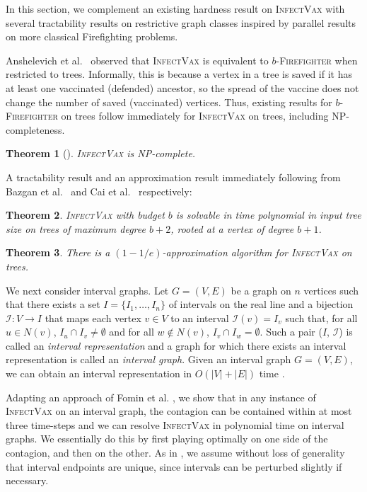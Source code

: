 \documentclass[unknownkeysallowed]{article}
\newtheorem{theorem}{Theorem}[section]
\theoremstyle{definition}\newtheorem{strategy}{Strategy}
\theoremstyle{definition}\newtheorem{notation}{Notation}[theorem]
\newcommand*{\Fire}{\textup{\textsc{Firefighter}}\xspace} %
\newcommand*{\bFire}{$b$-\Fire} %
\newcommand*{\IV}{\textup{\textsc{InfectVax}}\xspace}
\begin{document}
In this section, we complement an existing hardness result on \IV with several tractability results on restrictive graph classes inspired by parallel results on more classical Firefighting problems.  

Anshelevich et al.\ \cite{anshelevich_2012} observed that \IV is equivalent to \bFire when restricted to trees.
Informally, this is because a vertex in a tree is saved if it has at least one vaccinated (defended)  ancestor, so the spread of the vaccine does not change the number of saved (vaccinated) vertices.  Thus, existing results for \bFire on trees follow immediately for \IV on trees, including NP-completeness.
\begin{theorem}[\cite{anshelevich_2012}]
    \IV is NP-complete.
\end{theorem}

A tractability result and an approximation result immediately following from Bazgan et al.\  \cite{bazgan_2013} and Cai et al.\ \cite{cai_2008} respectively:

\begin{theorem}
    \IV with budget $b$ is solvable in time polynomial in input tree size on trees of maximum degree $b+2$, rooted at a vertex of degree $b+1$.
\end{theorem}

\begin{theorem}
    There is a $(1-1/e)$-approximation algorithm for \IV on trees.
\end{theorem}

We next consider interval graphs. Let $G=(V, E)$ be a graph on $n$ vertices such that there exists a set $I=\{I_1, \dots, I_n\}$ of intervals on the real line and a bijection $\mathcal{I}:V\rightarrow I$ that maps each vertex $v\in V$ to an interval $\mathcal{I}(v)=I_v$ such that, for all $u \in N(v)$, $I_u\cap I_v\neq\emptyset$ and for all $w\notin N(v)$, $I_v\cap I_w = \emptyset$. Such a pair ($I$, $\mathcal{I}$) is called an \emph{interval representation} and a graph for which there exists an interval representation is called an \emph{interval graph}. Given an interval graph $G=(V, E)$, we  can obtain an interval representation in $O(|V|+|E|)$ time \cite{booth_1976}.

Adapting an approach of Fomin et al. \cite{fomin_2016}, we show that in any instance of \IV on an interval graph, the contagion can be contained within at most three time-steps and we can resolve \IV in polynomial time on interval graphs. We essentially do this by first playing optimally on one side of the contagion, and then on the other. As in \cite{fomin_2016}, we assume without loss of generality that interval endpoints are unique, since intervals can be perturbed slightly if necessary.
\end{document}
